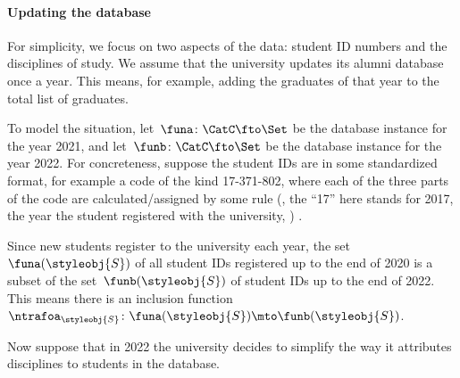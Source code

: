 \paragraph{Updating the database}

For simplicity, we focus on two aspects of the data: student ID numbers and the disciplines of study.
We assume that the university updates its alumni database once a year.
This means, for example, adding the graduates of that year to the total list of graduates.

To model the situation, let~$\funa \colon \CatC \fto \Set$ be the database instance for the year 2021, and let~$\funb \colon \CatC \fto \Set$ be the database instance for the year 2022.
For concreteness, suppose the student IDs are in some standardized format, for example a code of the kind 17-371-802, where each of the three parts of the code are calculated/assigned by some rule (, the ``17'' here stands for 2017, the year the student registered with the university, \etc)
.

Since new students register to the university each year, the set~$\funa(\styleobj{S})$ of all student IDs registered up to the end of 2020 is a subset of the set~$\funb(\styleobj{S})$ of student IDs up to the end of 2022.
This means there is an inclusion function~$\ntrafoa_{\styleobj{S}} \colon \funa(\styleobj{S}) \mto \funb(\styleobj{S})$.

Now suppose that in 2022 the university decides to simplify the way it attributes disciplines to students in the database.

